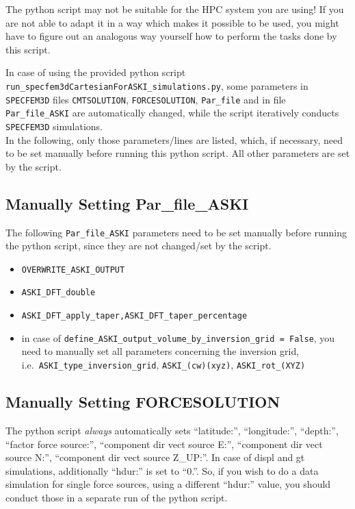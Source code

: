 \documentclass[12pt,a4paper]{article}
\newcommand{\lcode}[1]{\nolinkurl{#1}}
\newcommand{\lcodetitle}[1]{ {\ttfamily #1} }
\begin{document}
The python script may not be suitable for the HPC system you are using! If you are not able to adapt 
it in a way which makes it possible to be used, you might have to figure out an analogous way yourself 
how to perform the tasks done by this script.

In case of using the provided python script \lcode{run_specfem3dCartesianForASKI_simulations.py},
some parameters in \lcode{SPECFEM3D} files \lcode{CMTSOLUTION}, \lcode{FORCESOLUTION}, \lcode{Par_file} 
and in file \lcode{Par_file_ASKI} are automatically changed, while the script iteratively conducts 
\lcode{SPECFEM3D} simulations. \\
In the following, only those parameters/lines are listed, which, if necessary, need to be set 
manually before running this python script. All other parameters are set by the script.

\subsection{Manually Setting \lcodetitle{Par\_file\_ASKI}}
The following \lcode{Par_file_ASKI} parameters need to be set manually before running the python script, 
since they are not changed/set by the script.
\begin{itemize}
\item \lcode{OVERWRITE_ASKI_OUTPUT}
\item \lcode{ASKI_DFT_double}
\item \lcode{ASKI_DFT_apply_taper,ASKI_DFT_taper_percentage}
\item in case of \lcode{define_ASKI_output_volume_by_inversion_grid = False}, you need to manually set
  all parameters concerning the inversion grid, i.e.\ \lcode{ASKI_type_inversion_grid}, 
  \lcode{ASKI_(cw)(xyz)}, \lcode{ASKI_rot_(XYZ)}
\end{itemize}
%
\subsection{Manually Setting \lcodetitle{FORCESOLUTION}}
%
The python script \emph{always} automatically sets ``latitude:'', ``longitude:'', ``depth:'', 
``factor force source:'', ``component dir vect source E:'', ``component dir vect source N:'', 
``component dir vect source Z\_UP:''. In case of displ and gt simulations, additionally ``hdur:'' is set to ``0.''. 
So, if you wish to do a data simulation for single force sources, using a different ``hdur:'' value, you 
should conduct those in a separate run of the python script.
%
\end{document}
